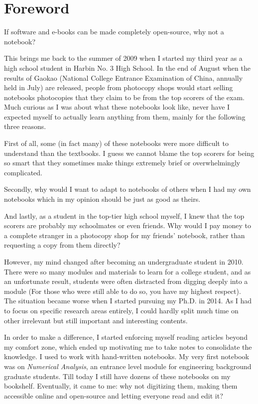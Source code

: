 \chapter*{Foreword}
If software and e-books can be made completely open-source, why not a notebook?

This brings me back to the summer of 2009 when I started my third year as a high school student in Harbin No. 3 High School. In the end of August when the results of Gaokao (National College Entrance Examination of China, annually held in July) are released, people from photocopy shops would start selling notebooks photocopies that they claim to be from the top scorers of the exam. Much curious as I was about what these notebooks look like, never have I expected myself to actually learn anything from them, mainly for the following three reasons.

First of all, some (in fact many) of these notebooks were more difficult to understand than the textbooks. I guess we cannot blame the top scorers for being so smart that they sometimes make things extremely brief or overwhelmingly complicated.

Secondly, why would I want to adapt to notebooks of others when I had my own notebooks which in my opinion should be just as good as theirs.

And lastly, as a student in the top-tier high school myself, I knew that the top scorers are probably my schoolmates or even friends. Why would I pay money to a complete stranger in a photocopy shop for my friends' notebook, rather than requesting a copy from them directly?

However, my mind changed after becoming an undergraduate student in 2010. There were so many modules and materials to learn for a college student, and as an unfortunate result, students were often distracted from digging deeply into a module (For those who were still able to do so, you have my highest respect). The situation became worse when I started pursuing my Ph.D. in 2014. As I had to focus on specific research areas entirely, I could hardly split much time on other irrelevant but still important and interesting contents.

In order to make a difference, I started enforcing myself reading articles beyond my comfort zone, which ended up motivating me to take notes to consolidate the knowledge. I used to work with hand-written notebooks. My very first notebook was on \textit{Numerical Analysis}, an entrance level module for engineering background graduate students. Till today I still have dozens of these notebooks on my bookshelf. Eventually, it came to me: why not digitizing them, making them accessible online and open-source and letting everyone read and edit it?

